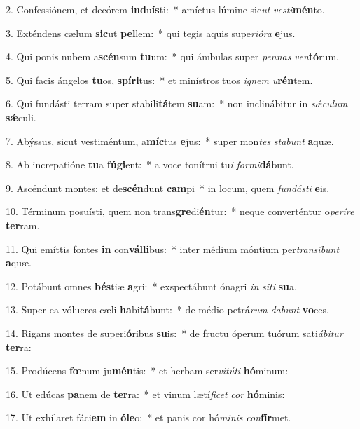 2. Confessiónem, et decórem \textbf{ind}u\textbf{ís}ti:~*  amíctus lúmine sic\textit{ut} \textit{ves}\textit{ti}\textbf{mén}to.\

3. Exténdens cælum \textbf{sic}ut \textbf{pel}lem:~*  qui tegis aquis supe\textit{ri}\textit{ó}\textit{ra} \textbf{e}jus.\

4. Qui ponis nubem a\textbf{scén}sum \textbf{tu}um:~*  qui ámbulas super \textit{pen}\textit{nas} \textit{ven}\textbf{tó}rum.\

5. Qui facis ángelos \textbf{tu}os, \textbf{spí}\textbf{ri}tus:~*  et minístros tuos \textit{i}\textit{gnem} \textit{u}\textbf{rén}tem.\

6. Qui fundásti terram super stabili\textbf{tá}tem \textbf{su}am:~*  non inclinábitur in \textit{sǽ}\textit{cu}\textit{lum} \textbf{sǽ}culi.\

7. Abýssus, sicut vestiméntum, a\textbf{míc}tus \textbf{e}jus:~*  super mon\textit{tes} \textit{sta}\textit{bunt} \textbf{a}quæ.\

8. Ab increpatióne \textbf{tu}a \textbf{fú}\textbf{gi}ent:~*  a voce tonítrui tu\textit{i} \textit{for}\textit{mi}\textbf{dá}bunt.\

9. Ascéndunt montes: et de\textbf{scén}dunt \textbf{cam}pi~*  in locum, quem \textit{fun}\textit{dás}\textit{ti} \textbf{e}is.\

10. Términum posuísti, quem non trans\textbf{gre}di\textbf{én}tur:~*  neque converténtur o\textit{pe}\textit{rí}\textit{re} \textbf{ter}ram.\

11. Qui emíttis fontes \textbf{in} con\textbf{vál}\textbf{li}bus:~*  inter médium móntium per\textit{trans}\textit{í}\textit{bunt} \textbf{a}quæ.\

12. Potábunt omnes \textbf{bés}tiæ \textbf{a}gri:~*  exspectábunt ónagri \textit{in} \textit{si}\textit{ti} \textbf{su}a.\

13. Super ea vólucres cæli \textbf{ha}bi\textbf{tá}bunt:~*  de médio petrá\textit{rum} \textit{da}\textit{bunt} \textbf{vo}ces.\

14. Rigans montes de superi\textbf{ó}ribus \textbf{su}is:~*  de fructu óperum tuórum sati\textit{á}\textit{bi}\textit{tur} \textbf{ter}ra:\

15. Prodúcens \textbf{fœ}num ju\textbf{mén}tis:~*  et herbam ser\textit{vi}\textit{tú}\textit{ti} \textbf{hó}minum:\

16. Ut edúcas \textbf{pa}nem de \textbf{ter}ra:~*  et vinum lætí\textit{fi}\textit{cet} \textit{cor} \textbf{hó}minis:\

17. Ut exhílaret fáci\textbf{em} in \textbf{ó}\textbf{le}o:~*  et panis cor hó\textit{mi}\textit{nis} \textit{con}\textbf{fír}met.\


